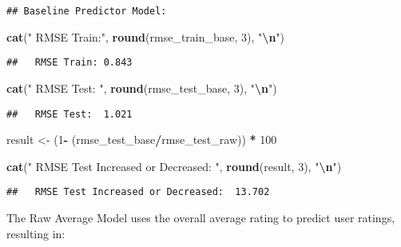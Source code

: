 \documentclass[
]{article}
\newenvironment{Shaded}{\begin{snugshade}}{\end{snugshade}}
\newcommand{\DecValTok}[1]{\textcolor[rgb]{0.00,0.00,0.81}{#1}}
\newcommand{\FunctionTok}[1]{\textcolor[rgb]{0.13,0.29,0.53}{\textbf{#1}}}
\newcommand{\NormalTok}[1]{#1}
\newcommand{\OtherTok}[1]{\textcolor[rgb]{0.56,0.35,0.01}{#1}}
\newcommand{\SpecialCharTok}[1]{\textcolor[rgb]{0.81,0.36,0.00}{\textbf{#1}}}
\newcommand{\StringTok}[1]{\textcolor[rgb]{0.31,0.60,0.02}{#1}}
\begin{document}
\begin{verbatim}
## Baseline Predictor Model:
\end{verbatim}

\begin{Shaded}
\begin{Highlighting}[]
\FunctionTok{cat}\NormalTok{(}\StringTok{"  RMSE Train:"}\NormalTok{, }\FunctionTok{round}\NormalTok{(rmse\_train\_base, }\DecValTok{3}\NormalTok{), }\StringTok{"}\SpecialCharTok{\textbackslash{}n}\StringTok{"}\NormalTok{)}
\end{Highlighting}
\end{Shaded}

\begin{verbatim}
##   RMSE Train: 0.843
\end{verbatim}

\begin{Shaded}
\begin{Highlighting}[]
\FunctionTok{cat}\NormalTok{(}\StringTok{"  RMSE Test: "}\NormalTok{, }\FunctionTok{round}\NormalTok{(rmse\_test\_base, }\DecValTok{3}\NormalTok{), }\StringTok{"}\SpecialCharTok{\textbackslash{}n}\StringTok{"}\NormalTok{)}
\end{Highlighting}
\end{Shaded}

\begin{verbatim}
##   RMSE Test:  1.021
\end{verbatim}

\begin{Shaded}
\begin{Highlighting}[]
\NormalTok{result }\OtherTok{\textless{}{-}}\NormalTok{ (}\DecValTok{1}\SpecialCharTok{{-}}\NormalTok{ (rmse\_test\_base}\SpecialCharTok{/}\NormalTok{rmse\_test\_raw)) }\SpecialCharTok{*} \DecValTok{100}

\FunctionTok{cat}\NormalTok{(}\StringTok{"  RMSE Test Increased or Decreased: "}\NormalTok{, }\FunctionTok{round}\NormalTok{(result, }\DecValTok{3}\NormalTok{), }\StringTok{"}\SpecialCharTok{\textbackslash{}n}\StringTok{"}\NormalTok{)}
\end{Highlighting}
\end{Shaded}

\begin{verbatim}
##   RMSE Test Increased or Decreased:  13.702
\end{verbatim}

The Raw Average Model uses the overall average rating to predict user
ratings, resulting in:
\end{document}
